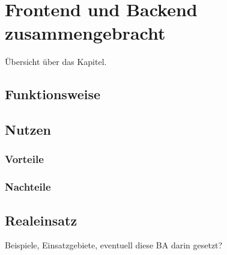 \chapter{Frontend und Backend zusammengebracht}

Übersicht über das Kapitel.

\section{Funktionsweise}

\section{Nutzen}

\subsection{Vorteile}

\subsection{Nachteile}

\section{Realeinsatz}

Beispiele, Einsatzgebiete, eventuell diese BA darin gesetzt?
